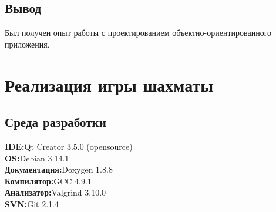 \subsection*{Вывод}
Был получен опыт работы с проектированием объектно-ориентированного приложения. 

\section*{Реализация игры шахматы}

\subsection*{Среда разработки}

\noindent\textbf{IDE:}Qt Creator 3.5.0 (opensource)\\
\textbf{OS:}Debian 3.14.1\\
\textbf{Документация:}Doxygen 1.8.8\\
\textbf{Компилятор:}GCC 4.9.1\\
\textbf{Анализатор:}Valgrind 3.10.0\\
\textbf{SVN:}Git 2.1.4

